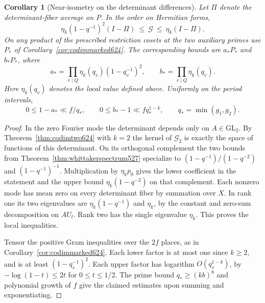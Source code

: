 \documentclass[a4paper,11pt]{article}
\newtheorem{corollary}[proposition]{Corollary}
\theoremstyle{definition}
\theoremstyle{remark}
\numberwithin{equation}{section}
\begin{document}
\begin{corollary}[Near-isometry on the determinant differences]
\leavevmode\label{cor:markednearisometry625}
Let \(\Pi\) denote the determinant-fiber average on \(P\).
In the order on Hermitian forms,
\[
     \eta_k(1-q^{-1})^2(I-\Pi)
       \ \le\ \mathcal G\ \le\ \eta_k(I-\Pi).
\]
On any product of the prescribed restriction cosets at the
two auxiliary primes use \(P_*\) of
Corollary~\ref{cor:codimmarked624}. The corresponding bounds
are \(a_*P_*\) and \(b_*P_*\), where
\[
      a_*=\prod_{v\mid Q}\eta_k(q_v)(1-q_v^{-1})^2,\qquad
      b_*=\prod_{v\mid Q}\eta_k(q_v).
\]
Here \(\eta_k(q_v)\) denotes the local value defined above.
Uniformly on the period intervals,
\[
       0\le1-a_*\ll f/q_*,
       \qquad 0\le b_*-1\ll f q_*^{1-k},
        \qquad q_*=\min(g_1,g_2).
\]
\end{corollary}
\begin{proof}
In the zero Fourier mode the determinant depends only on
\(A\in\mathrm{GL}_2\). By Theorem~\ref{thm:codimtwo624}
with \(k=2\) the kernel of \(\mathcal G_2\) is exactly the
space of functions of this determinant. On its orthogonal
complement the two bounds from
Theorem~\ref{thm:whittakerspectrum527} specialize to
\((1-q^{-1})/(1-q^{-2})\) and \((1-q^{-1})^{-1}\).
Multiplication by \(\eta_k p_0\) gives the lower coefficient
in the statement and the upper bound \(\eta_k(1-q^{-2})\)
on that complement. Each nonzero mode has mean zero on every
determinant fiber by summation over \(X\). In rank one its
two eigenvalues are \(\eta_k(1-q^{-1})\) and \(\eta_k\), by
the constant and zero-sum decomposition on \(A U_l\).
Rank two has the single eigenvalue \(\eta_k\). This proves
the local inequalities.

Tensor the positive Gram inequalities over the \(2f\) places,
as in Corollary~\ref{cor:codimmarked624}. Each lower factor is
at most one since \(k\ge2\), and is at least \((1-q_v^{-1})^2\).
Each upper factor has logarithm \(O(q_v^{1-k})\), by
\(-\log(1-t)\le 2t\) for \(0\le t\le1/2\).
The prime bound \(q_*\ge(kb)^8\) and polynomial growth of \(f\)
give the claimed estimates upon summing and exponentiating.
\end{proof}
\end{document}
